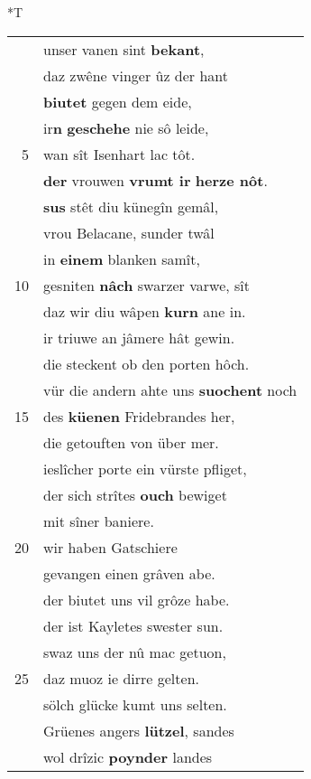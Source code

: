 \documentclass[8pt,a4paper,notitlepage]{article}
\begin{document}
\begin{table}[ht]
\begin{minipage}[t]{0.5\linewidth}
\end{minipage}
\hspace{0.5cm}
\begin{minipage}[t]{0.5\linewidth}
\small
\begin{center}*T
\end{center}
\begin{tabular}{rl}
 & unser vanen sint \textbf{bekant},\\ 
 & daz zwêne vinger ûz der hant\\ 
 & \textbf{biutet} gegen dem eide,\\ 
 & ir\textbf{n} \textbf{geschehe} nie sô leide,\\ 
5 & wan sît Isenhart lac tôt.\\ 
 & \textbf{der} vrouwen \textbf{vrumt ir} \textbf{herze nôt}.\\ 
 & \textbf{sus} stêt diu künegîn gemâl,\\ 
 & vrou Belacane, sunder twâl\\ 
 & in \textbf{einem} blanken samît,\\ 
10 & gesniten \textbf{nâch} swarzer varwe, sît\\ 
 & daz wir diu wâpen \textbf{kurn} ane in.\\ 
 & ir triuwe an jâmere hât gewin.\\ 
 & die steckent ob den porten hôch.\\ 
 & vür die andern ahte uns \textbf{suochent} noch\\ 
15 & des \textbf{küenen} Fridebrandes her,\\ 
 & die getouften von über mer.\\ 
 & ieslîcher porte ein vürste pfliget,\\ 
 & der sich strîtes \textbf{ouch} bewiget\\ 
 & mit sîner baniere.\\ 
20 & wir haben Gatschiere\\ 
 & gevangen einen grâven abe.\\ 
 & der biutet uns vil grôze habe.\\ 
 & der ist Kayletes swester sun.\\ 
 & swaz uns der nû mac getuon,\\ 
25 & daz muoz ie dirre gelten.\\ 
 & sölch glücke kumt uns selten.\\ 
 & Grüenes angers \textbf{lützel}, sandes\\ 
 & wol drîzic \textbf{poynder} landes\\ 

\end{tabular}
\end{minipage}
\end{table}
\end{document}

